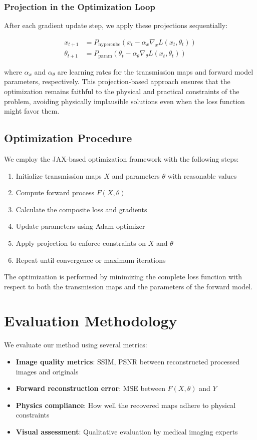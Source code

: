 \documentclass[nomenclature, english, bibtex]{kththesis}
\numberwithin{listing}{chapter}
\begin{document}
\subsubsection{Projection in the Optimization Loop}
After each gradient update step, we apply these projections sequentially:

\begin{align}
x_{t+1} &= P_{\text{hypercube}}(x_t - \alpha_x \nabla_x L(x_t, \theta_t)) \\
\theta_{t+1} &= P_{\text{param}}(\theta_t - \alpha_\theta \nabla_\theta L(x_t, \theta_t))
\end{align}

where $\alpha_x$ and $\alpha_\theta$ are learning rates for the transmission maps and forward model parameters, respectively. This projection-based approach ensures that the optimization remains faithful to the physical and practical constraints of the problem, avoiding physically implausible solutions even when the loss function might favor them.

\subsection{Optimization Procedure}
We employ the JAX-based optimization framework with the following steps:
\begin{enumerate}
    \item Initialize transmission maps $X$ and parameters $\theta$ with reasonable values
    \item Compute forward process $F(X, \theta)$
    \item Calculate the composite loss and gradients
    \item Update parameters using Adam optimizer
    \item Apply projection to enforce constraints on $X$ and $\theta$
    \item Repeat until convergence or maximum iterations
\end{enumerate}

The optimization is performed by minimizing the complete loss function with respect to both the transmission maps and the parameters of the forward model.
\section{Evaluation Methodology}
We evaluate our method using several metrics:
\begin{itemize}
    \item \textbf{Image quality metrics}: SSIM, PSNR between reconstructed processed images and originals
    \item \textbf{Forward reconstruction error}: MSE between $F(X, \theta)$ and $Y$
    \item \textbf{Physics compliance}: How well the recovered maps adhere to physical constraints
    \item \textbf{Visual assessment}: Qualitative evaluation by medical imaging experts
\end{itemize}
\end{document}
